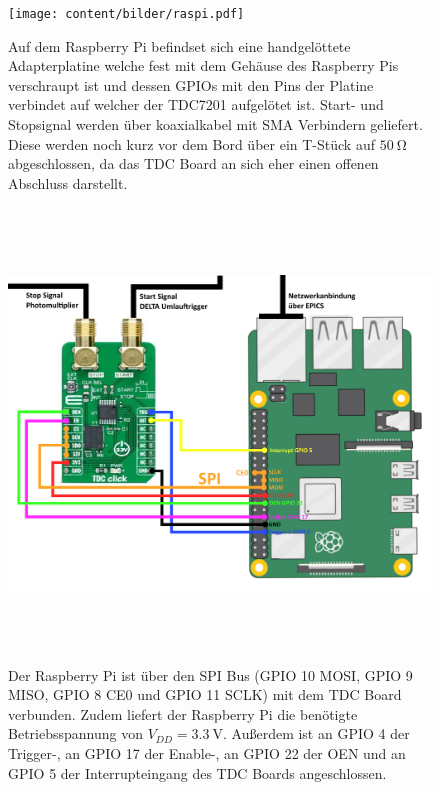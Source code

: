 \begin{figure}
  \centering
  \texttt{[image: content/bilder/raspi.pdf]}
  \caption{Auf dem Raspberry Pi befindset sich eine handgelöttete Adapterplatine welche fest mit dem Gehäuse
    des Raspberry Pis verschraupt ist und dessen GPIOs mit den Pins der Platine verbindet auf welcher der TDC7201
    aufgelötet ist. Start- und Stopsignal werden über koaxialkabel mit SMA Verbindern geliefert. Diese werden noch
    kurz vor dem Bord über ein T-Stück auf $\SI{50}{\ohm}$ abgeschlossen, da das TDC Board an sich eher einen offenen
    Abschluss darstellt.}
  \label{fig:raspi}
\end{figure}

\begin{figure}
  \centering
  \includegraphics[width=16cm, height=12cm]{content/bilder/RaspiTdcSchaltung.pdf}
  \caption{Der Raspberry Pi ist über den SPI Bus (GPIO 10 MOSI, GPIO 9 MISO, GPIO 8 CE0 und GPIO 11 SCLK) mit dem TDC Board verbunden. 
    Zudem liefert der Raspberry Pi die benötigte Betriebsspannung von $V_{DD}=\SI{3,3}{\volt}$. Außerdem ist an GPIO 4 der
    Trigger-, an GPIO 17 der Enable-, an GPIO 22 der OEN und an GPIO 5 der Interrupteingang des TDC Boards angeschlossen. } 
  \label{fig:raspitdcschaltung}
\end{figure}


